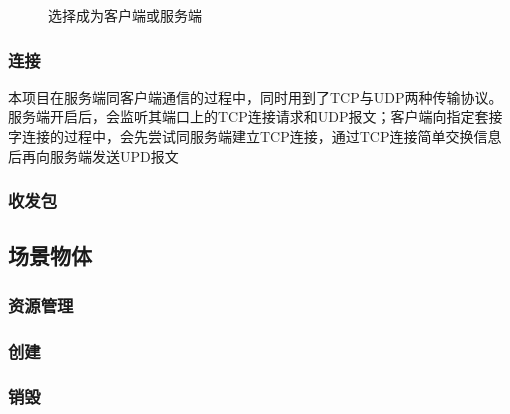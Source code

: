 \documentclass[conference]{IEEEtran}
\begin{document}
\begin{figure}[h!]  
	\setlength{\abovecaptionskip}{.2cm}   %
	\setlength{\belowcaptionskip}{0cm}   %
    \centering  %
    \caption{选择成为客户端或服务端}
    \label{fig:beCS}
\end{figure}

\subsubsection{连接}
本项目在服务端同客户端通信的过程中，同时用到了TCP与UDP两种传输协议。服务端开启后，会监听其端口上的TCP连接请求和UDP报文；客户端向指定套接字连接的过程中，会先尝试同服务端建立TCP连接，通过TCP连接简单交换信息后再向服务端发送UPD报文
\subsubsection{收发包}

\subsection{场景物体}
\subsubsection{资源管理}
\subsubsection{创建}
\subsubsection{销毁}
\end{document}
